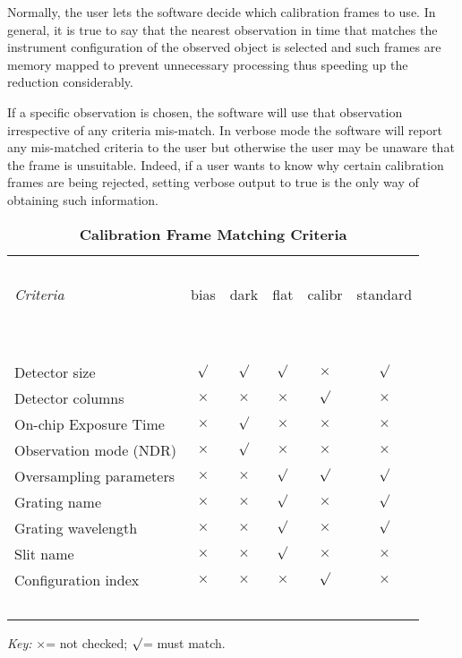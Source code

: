 \documentclass[a4paper]{book}
\renewcommand{\_}{{\tt\char'137}}
\newcommand{\cross}{$\times$}
\newcommand{\tick}{$\surd$}
\begin{document}
Normally, the user lets the software decide which calibration frames to
use. In general, it is true to say that the nearest observation in time
that matches the instrument configuration of the observed object is
selected and such frames are memory mapped to prevent unnecessary
processing thus speeding up the reduction considerably. 

If a specific observation is chosen, the software will use that
observation irrespective of any criteria mis-match. In verbose mode the
software will report any mis-matched criteria to the user but otherwise
the user may be unaware that the frame is unsuitable. Indeed, if a user
wants to know why certain calibration frames are being rejected, setting
verbose output to {\sc true} is the only way of obtaining such
information. 

\begin{table}
\begin{center}
\caption{\bf Calibration Frame Matching Criteria} \label{tab1}
\vglue 0.6cm
\begin{tabular}{|l|c|c|c|c|c|}
\hline
\ \ & \ \ & \ \ & \ \ & \ \ & \ \ \\
{\em Criteria} & {\sc bias} & {\sc dark} & {\sc flat} & {\sc calibr} & {\sc standard} \\
\ \ & \ \ & \ \ & \ \ & \ \ & \ \ \\
\hline
\ \ & \ \ & \ \ & \ \ & \ \ & \ \ \\
Detector size               & \tick   & \tick   & \tick   & \cross  & \tick  \\
Detector columns            & \cross  & \cross  & \cross  & \tick   & \cross \\
On-chip Exposure Time       & \cross  & \tick   & \cross  & \cross  & \cross \\
Observation mode (NDR)      & \cross  & \tick   & \cross  & \cross  & \cross \\
Oversampling parameters     & \cross  & \cross  & \tick   & \tick   & \tick  \\
Grating name                & \cross  & \cross  & \tick   & \cross  & \tick  \\
Grating wavelength          & \cross  & \cross  & \tick   & \cross  & \tick  \\
Slit name                   & \cross  & \cross  & \tick   & \cross  & \cross \\
Configuration index         & \cross  & \cross  & \cross  & \tick   & \cross \\
\ \ & \ \ & \ \ & \ \ & \ \ & \ \ \\
\hline
\end{tabular}
\vglue 0.3cm
{\em Key:} \cross = not checked; \tick = must match.
\end{center}
\end{table}
\end{document}
